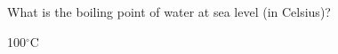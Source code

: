 \question What is the boiling point of water at sea level (in Celsius)?
\begin{solution}
100$^\circ$C
\end{solution}
